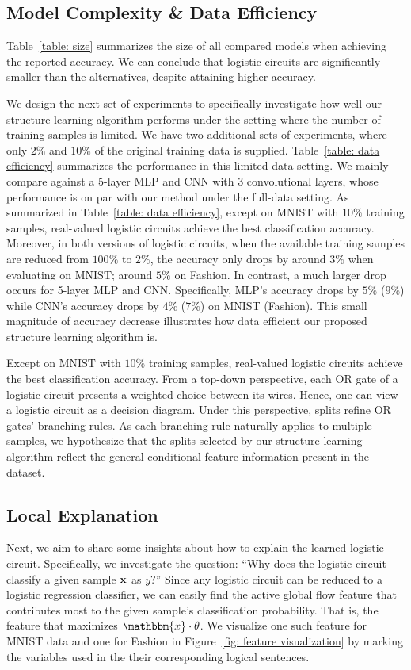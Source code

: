 \documentclass[letterpaper]{article} %
\newcommand{\sample}{{\bf x}}
\begin{document}
\subsection{Model Complexity \& Data Efficiency}
Table~\ref{table: size} summarizes the size of all compared models when achieving the reported  accuracy. We can conclude that logistic circuits are significantly smaller than the alternatives, despite attaining higher accuracy.

We design the next set of experiments to specifically investigate how well our structure learning algorithm performs under the setting where the number of training samples is limited.  We have two additional sets of experiments, where only $2\%$ and $10\%$ of the original training data is supplied.
Table~\ref{table: data efficiency} summarizes the performance in this limited-data setting.
We mainly compare against a 5-layer MLP and CNN with 3 convolutional layers, whose performance is on par with our method under the full-data setting. As summarized in Table~\ref{table: data efficiency}, except on MNIST with $10\%$ training samples, real-valued logistic circuits achieve the best classification accuracy. Moreover, in both versions of logistic circuits, when the available training samples are reduced from $100\%$ to $2\%$, the accuracy only drops by around $3\%$ when evaluating on MNIST; around $5\%$ on Fashion. In contrast, a much larger drop occurs for 5-layer MLP and CNN. Specifically, MLP's accuracy drops by $5\%$ ($9\%$) while CNN's accuracy drops by $4\%$ ($7\%$) on MNIST (Fashion). This small magnitude of accuracy decrease illustrates how data efficient our proposed structure learning algorithm is.

Except on MNIST with $10\%$ training samples, real-valued logistic circuits achieve the best classification accuracy. From a top-down perspective, each OR gate of a logistic circuit presents a weighted choice between its wires. Hence, one can view a logistic circuit as a decision diagram.
Under this perspective, splits refine OR gates' branching rules. As each branching rule naturally applies to multiple samples, we hypothesize that the splits selected by our structure learning algorithm reflect the general conditional feature information present in the dataset.



\subsection{Local Explanation}
\label{s: interpretability}
Next, we aim to share some insights about how to explain the learned logistic circuit. Specifically, we investigate the question: ``Why does the logistic circuit classify a given sample $\sample$ as $y$?'' Since any logistic circuit can be reduced to a logistic regression classifier, we can easily find the active global flow feature that contributes most to the given sample's classification probability. That is, the feature that maximizes $\mathbbm{x}\cdot\theta$. We visualize one such feature for MNIST data and one for Fashion in Figure~\ref{fig: feature visualization} by marking the variables used in the their corresponding logical sentences.
\end{document}
